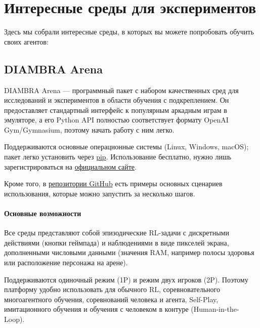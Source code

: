 \documentclass[11pt,a4paper]{article}
\begin{document}
\section{Интересные среды для экспериментов}\label{interesting-environments-to-try}

Здесь мы собрали интересные среды, в которых вы можете попробовать обучить своих агентов:

\subsection{DIAMBRA Arena}\label{diambra-arena}


DIAMBRA Arena --- программный пакет с набором качественных сред для исследований и экспериментов в области обучения с подкреплением. Он предоставляет стандартный интерфейс к популярным аркадным играм в эмуляторе, а его Python API полностью соответствует формату OpenAI Gym/Gymnasium, поэтому начать работу с ним легко.

Поддерживаются основные операционные системы (Linux, Windows, macOS); пакет легко установить через \href{https://pypi.org/project/diambra-arena/}{pip}. Использование бесплатно, нужно лишь зарегистрироваться на \href{https://diambra.ai/register/}{официальном сайте}.

Кроме того, в \href{https://github.com/diambra/}{репозитории GitHub} есть примеры основных сценариев использования, которые можно запустить за несколько шагов.

\paragraph{Основные возможности}\label{main-features}

Все среды представляют собой эпизодические RL-задачи с дискретными действиями (кнопки геймпада) и наблюдениями в виде пикселей экрана, дополненными числовыми данными (значения RAM, например полосы здоровья или расположение персонажа на арене).

Поддерживаются одиночный режим (1P) и режим двух игроков (2P). Поэтому платформу удобно использовать для обычного RL, соревновательного многоагентного обучения, соревнований человека и агента, Self-Play, имитационного обучения и обучения с человеком в контуре (Human-in-the-Loop).
\end{document}
